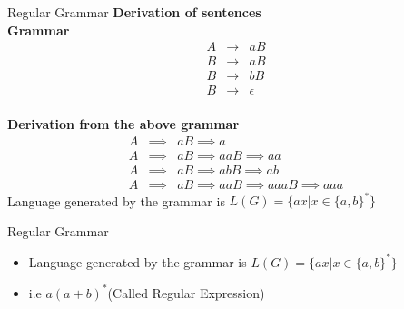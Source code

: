 \documentclass{beamer}
\begin{document}
\begin{frame}{Regular Grammar}
	\textbf{Derivation of sentences}
	\\ \textbf{Grammar}
	\begin{eqnarray*}
	A &\rightarrow& aB\\
	B &\rightarrow& aB\\
	B &\rightarrow& bB\\
	B&\rightarrow& \epsilon
	\end{eqnarray*}
	\\ \textbf{Derivation from the above grammar}
\begin{eqnarray*}
	A &\implies& aB \implies a\\
	A &\implies& aB \implies aaB \implies aa\\
	A &\implies& aB \implies abB \implies ab\\
	A &\implies& aB \implies aaB \implies aaaB \implies aaa
\end{eqnarray*}
Language generated by the grammar is $L(G)=\{ax|x\in \{a,b\}^*\}$
\end{frame}
\begin{frame}{Regular Grammar}
\begin{itemize}
	\item Language generated by the grammar is $L(G)=\{ax|x\in \{a,b\}^*\}$
	\item i.e $a(a+b)^*$(Called Regular Expression)
\end{itemize}
	
\end{frame}
\end{document}
